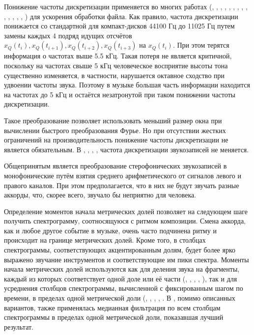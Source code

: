 Понижение частоты дискретизации применяется во многих работах
(\cite{Sheh2003}, \cite{Bello2005}, \cite{Lee2006}, \cite{Burgoyne2007},
\cite{Lee2007}, \cite{Papadopoulos2007}, \cite{Mauch2008},
\cite{Khadkevich2009}, \cite{Mauch2009}, \cite{Oudre2009}, \cite{Reed2009},
\cite{Mauch2010}, \cite{Khadkevich2011}, \cite{Ni2011}, \cite{Humphrey2012})
для ускорения обработки файла. Как правило, частота дискретизации понижается со
стандартной для компакт-дисков 44100 Гц до 11025 Гц путем замены каждых 4 подряд
идущих отсчётов $x_Q(t_i), x_Q(t_{i+1}), x_Q(t_{i+2}), x_Q(t_{i+3})$ на
$x_Q(t_i)$. При этом терятся информация о частотах выше 5.5 кГц. Такая потеря
не является критичной, поскольку на частотах свыше 5 кГц человеческое
восприятие высоты тона существенно изменяется, в частности, нарушается октавное
сходство при удвоении частоты звука. Поэтому в музыке большая часть информации
находится на частотах до 5 кГц и остаётся незатронутой при таком понижении
частоты дискретизации.

Такое преобразование позволяет использовать меньший размер окна при вычислении
быстрого преобразования Фурье. Но при отсутствии жестких ограничений на
производительность понижение частоты дискретизации не является обязательным. В
\cite{Zhang2008}, \cite{Cho2010}, \cite{Rocher2010}, \cite{Cho2011},
\cite{DeHaas2012} частота дискретизации звукозаписей не меняется.

Общепринятым является преобразование стерофонических звукозаписей в
монофонические путём взятия среднего арифметического от сигналов левого и
правого каналов. При этом предполагается, что в них не будут звучать разные
аккорды, что, скорее всего, звучало бы неприятно для человека.

Определение моментов начала метрических долей позволяет на следующем шаге
получить спектрограмму, соотносящуюся с ритмом композиции. Смена аккорда, как и
любое другое событие в музыке, очень часто подчинена ритму и происходит на
границе метрических долей. Кроме того, в столбцах спектрограммы, соответствующих
акцентированным долям, будет более ярко выражено звучание инструментов и
соответствующие им пики спектра. Моменты начала метрических долей используются
как для деления звука на фрагменты, каждый из которых соответствует одной доле
или её части (\cite{Yoshioka2004}, \cite{Sumi2008}, \cite{Weller2009},
\cite{Mcvicar2011}, \cite{Ni2011}), так и для усреднения столбцов спектрограммы,
вычисленной с фиксированным шагом по времени, в пределах одной метрической доли
(\cite{Bello2005}, \cite{Mauch2009}, \cite{Mauch2010}, \cite{DeHaas2012},
\cite{Chen2012}. В \cite{Chen2012}, помимо описанных вариантов, также
применялась медианная фильтрация по всем столбцам спектрограммы в пределах одной
метрической доли, показавшая лучший результат.

